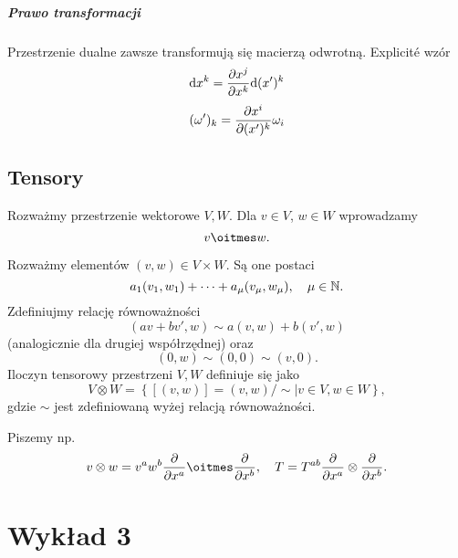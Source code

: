 \documentclass[11pt]{book}
\theoremstyle{definition} %
\theoremstyle{plain} %
\theoremstyle{remark} %
\theoremstyle{underline}
\begin{document}
  \paragraph{Prawo transformacji}
  Przestrzenie dualne zawsze transformują się macierzą odwrotną.
  Explicit\'e wzór
  \begin{displaymath}
    \mathrm{d} x^k = \frac{\partial x^j}{\partial x^k} \mathrm{d} (x')^k
  \end{displaymath}
  \begin{displaymath}
    (\omega')_k = \frac{\partial x^i}{\partial (x')^k} \omega_i
  \end{displaymath}
  

  \section{Tensory}
  
  Rozważmy przestrzenie wektorowe $V, W$.
  Dla $v \in V$, $w\in W$ wprowadzamy
  \begin{displaymath}
    v \oitmes w.
  \end{displaymath}

  Rozważmy  elementów $(v, w) \in V \times W$.
  Są one postaci
  \begin{displaymath}
    a_1 ( v_1, w_1) +\dots + a_\mu(v_\mu, w_\mu), \quad \mu \in \mathbb{N}.
  \end{displaymath}
  Zdefiniujmy relację równoważności 
  \begin{displaymath}
    (a v + b v', w) \sim a (v, w) + b (v', w)
  \end{displaymath}
  (analogicznie dla drugiej współrzędnej) oraz
  \begin{displaymath}
    (0, w) \sim (0, 0) \sim (v, 0).
  \end{displaymath}
  Iloczyn tensorowy przestrzeni $V, W$ definiuje się jako 
  \begin{displaymath}
    V \otimes W = \left\{ [(v, w)] = (v, w) / \sim | v\in V, w\in W \right\},
  \end{displaymath}
  gdzie $\sim$ jest zdefiniowaną wyżej relacją równoważności.

  Piszemy np.
  \begin{displaymath}
    v\otimes w = v^a w^b \ptf{}{x^a} \oitmes \ptf{}{x^b}, 
    \quad T = T^{ab} \ptf{}{x^a} \otimes \ptf{}{x^b}.
  \end{displaymath}

  \chapter{Wykład 3}
\end{document}
